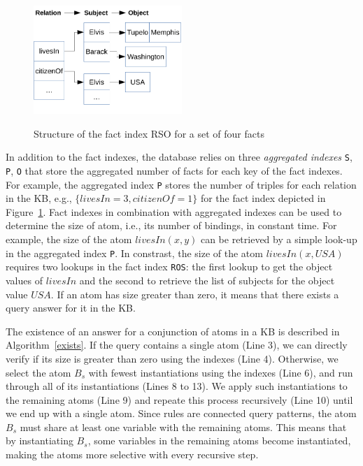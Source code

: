 {\begin{figure}
\includegraphics[width=0.5\textwidth]{figures/indexes}\
\caption{Structure of the fact index RSO for a set of four facts}
\label{indexes}
\end{figure}

In addition to the fact indexes, the database relies 
on three \emph{aggregated indexes} \texttt{S}, \texttt{P}, \texttt{O} that store the aggregated number of facts for each
key of the fact indexes. For example, the aggregated index \texttt{P} stores the number of triples for each relation
in the KB, e.g., $\{ livesIn=3, citizenOf=1 \}$ for the fact index depicted in Figure~\ref{indexes}. 
Fact indexes in combination with aggregated indexes can be used to determine the size of atom, i.e., its number of bindings, 
in constant time. For example, the size of the atom $livesIn(x,y)$ can be retrieved by a simple look-up 
in the aggregated index \texttt{P}. In constrast, the size of the atom $livesIn(x, USA)$ requires two 
lookups in the fact index \texttt{ROS}: the first lookup to get the object values of $livesIn$ and the second
to retrieve the list of subjects for the object value $USA$. If an atom has size greater than zero, it means
that there exists a query answer for it in the KB.

The existence of an answer for a conjunction of atoms in a KB is described in Algorithm~\ref{exists}. 
If the query contains a single atom (Line 3), we can directly verify if its size is greater than zero using
the indexes (Line 4). Otherwise, we select the atom $B_s$ with fewest instantiations using the indexes (Line 6), 
and run through all of its instantiations (Lines 8 to 13). We apply such instantiations to the remaining atoms (Line 9)
and repeate this process recursively (Line 10) until we end up with a single atom. Since rules are connected query patterns, the atom $B_s$ must share at least
one variable with the remaining atoms. This means that by instantiating $B_s$, some variables in the remaining atoms 
become instantiated, making the atoms more selective with every recursive step.

}
